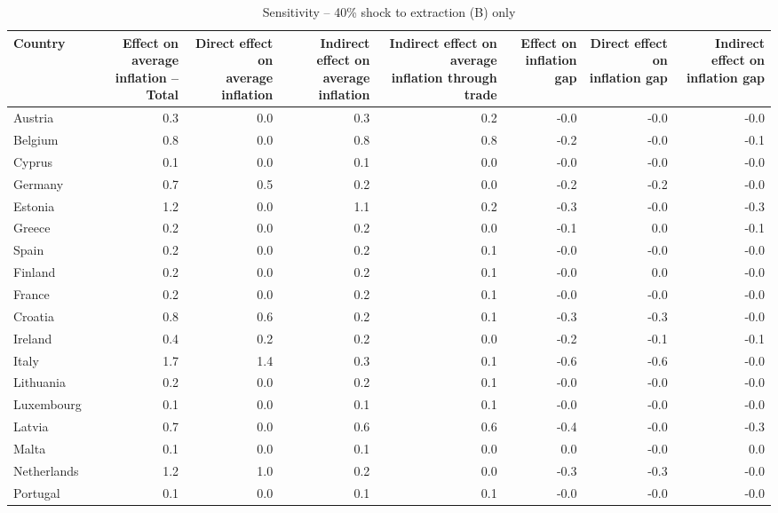 \documentclass[11pt]{article}
\begin{document}
\begin{table}[H]
\centering
\caption{Sensitivity -- 40\% shock to extraction (B) only}
\scriptsize
\setlength{\tabcolsep}{1.2pt}
\begin{tabular}{lrrrrrrr}
\toprule
Country & \shortstack{Effect on average\\inflation -- Total} & \shortstack{Direct effect on\\average inflation} & \shortstack{Indirect effect on\\average inflation} & \shortstack{Indirect effect on average\\inflation through trade} & \shortstack{Effect on\\inflation gap} & \shortstack{Direct effect on\\inflation gap} & \shortstack{Indirect effect on\\inflation gap}
 \\
\midrule
Austria & 0.3 & 0.0 & 0.3 & 0.2 & -0.0 & -0.0 & -0.0
 \\
Belgium & 0.8 & 0.0 & 0.8 & 0.8 & -0.2 & -0.0 & -0.1
 \\
Cyprus & 0.1 & 0.0 & 0.1 & 0.0 & -0.0 & -0.0 & -0.0
 \\
Germany & 0.7 & 0.5 & 0.2 & 0.0 & -0.2 & -0.2 & -0.0
 \\
Estonia & 1.2 & 0.0 & 1.1 & 0.2 & -0.3 & -0.0 & -0.3
 \\
Greece & 0.2 & 0.0 & 0.2 & 0.0 & -0.1 & 0.0 & -0.1
 \\
Spain & 0.2 & 0.0 & 0.2 & 0.1 & -0.0 & -0.0 & -0.0
 \\
Finland & 0.2 & 0.0 & 0.2 & 0.1 & -0.0 & 0.0 & -0.0
 \\
France & 0.2 & 0.0 & 0.2 & 0.1 & -0.0 & -0.0 & -0.0
 \\
Croatia & 0.8 & 0.6 & 0.2 & 0.1 & -0.3 & -0.3 & -0.0
 \\
Ireland & 0.4 & 0.2 & 0.2 & 0.0 & -0.2 & -0.1 & -0.1
 \\
Italy & 1.7 & 1.4 & 0.3 & 0.1 & -0.6 & -0.6 & -0.0
 \\
Lithuania & 0.2 & 0.0 & 0.2 & 0.1 & -0.0 & -0.0 & -0.0
 \\
Luxembourg & 0.1 & 0.0 & 0.1 & 0.1 & -0.0 & -0.0 & -0.0
 \\
Latvia & 0.7 & 0.0 & 0.6 & 0.6 & -0.4 & -0.0 & -0.3
 \\
Malta & 0.1 & 0.0 & 0.1 & 0.0 & 0.0 & -0.0 & 0.0
 \\
Netherlands & 1.2 & 1.0 & 0.2 & 0.0 & -0.3 & -0.3 & -0.0
 \\
Portugal & 0.1 & 0.0 & 0.1 & 0.1 & -0.0 & -0.0 & -0.0

\end{tabular}
\end{table}
\end{document}
